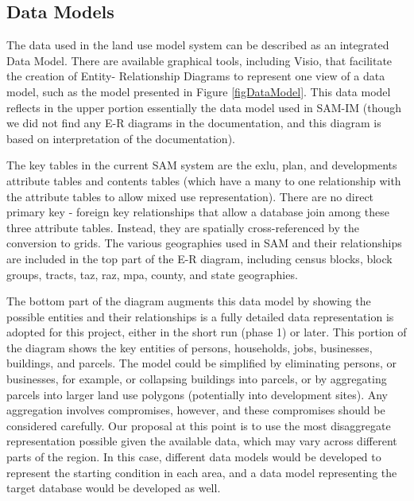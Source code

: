 \subsection{Data Models}
The data used in the land use model system can be described as an integrated Data Model.
There are available graphical tools, including Visio, that facilitate the creation of Entity-
Relationship Diagrams to represent one view of a data model, such as the model presented in 
Figure \ref{figDataModel}.  This data model reflects in the upper portion essentially the data 
model used in SAM-IM (though we did not find any E-R diagrams in the documentation, and this 
diagram is based on interpretation of the documentation).

The key tables in the current SAM system are the exlu, plan, and developments attribute tables and
contents tables (which have a many to one relationship with the attribute tables to allow mixed use
representation).  There are no direct primary key - foreign key relationships that allow a database
join among these three attribute tables.  Instead, they are spatially cross-referenced by the 
conversion to grids.  The various geographies used in SAM and their relationships are included
in the top part of the E-R diagram, including census blocks, block groups, tracts, taz, raz, mpa,
county, and state geographies.

The bottom part of the diagram augments this data model by showing the possible entities and their
relationships is a fully detailed data representation is adopted for this project, either in the
short run (phase 1) or later.  This portion of the diagram shows the key entities of persons, 
households, jobs, businesses, buildings, and parcels.  The model could be simplified by eliminating
persons, or businesses, for example, or collapsing buildings into parcels, or by aggregating 
parcels into larger land use polygons (potentially into development sites).  Any aggregation involves compromises, however, and these compromises should be considered carefully.  Our proposal at this point is to use the most disaggregate representation possible given the available data, which may vary across different parts of the region.  In this case, different data models would be developed to represent the
starting condition in each area, and a data model representing the target database would be developed
as well.


